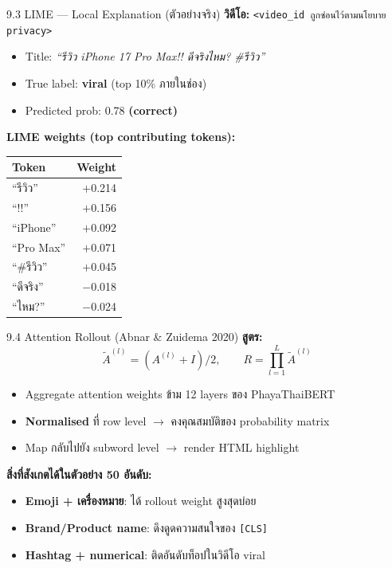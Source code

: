 \documentclass[aspectratio=169,11pt,xcolor=dvipsnames]{beamer}
\newcommand{\hl}[1]{\textcolor{kmitlOrange}{\textbf{#1}}}
\begin{document}
\begin{frame}[shrink=5]{9.3 LIME — Local Explanation (ตัวอย่างจริง)}
  \footnotesize
  \textbf{วิดีโอ:} \texttt{<\texttt{video\_id} ถูกซ่อนไว้ตามนโยบาย privacy>}
  \begin{itemize}
    \item Title: \emph{``รีวิว iPhone 17 Pro Max!! ดีจริงไหม? \#รีวิว''}
    \item True label: \hl{viral} (top 10\% ภายในช่อง)
    \item Predicted prob: 0.78 \hl{(correct)}
  \end{itemize}
  \vspace{0.3em}
  \textbf{LIME weights (top contributing tokens):}
  \begin{center}
    \begin{tabular}{lr}
      \toprule
      \textbf{Token} & \textbf{Weight}\\
      \midrule
      ``รีวิว''       & $+$0.214\\
      ``!!''          & $+$0.156\\
      ``iPhone''      & $+$0.092\\
      ``Pro Max''     & $+$0.071\\
      ``\#รีวิว''      & $+$0.045\\
      \midrule
      ``ดีจริง''       & $-$0.018\\
      ``ไหม?''         & $-$0.024\\
      \bottomrule
    \end{tabular}
  \end{center}
\end{frame}

\begin{frame}{9.4 Attention Rollout (Abnar \& Zuidema 2020)}
  \textbf{สูตร:}
  \[
    \tilde{A}^{(l)} = (A^{(l)} + I)/2, \qquad
    R = \prod_{l=1}^{L} \tilde{A}^{(l)}
  \]
  \begin{itemize}
    \item Aggregate attention weights ข้าม 12 layers ของ PhayaThaiBERT
    \item \hl{Normalised} ที่ row level $\rightarrow$ คงคุณสมบัติของ probability matrix
    \item Map กลับไปยัง subword level $\rightarrow$ render HTML highlight
  \end{itemize}
  \vspace{0.4em}
  \textbf{สิ่งที่สังเกตได้ในตัวอย่าง 50 อันดับ:}
  \begin{itemize}
    \item \hl{Emoji + เครื่องหมาย}: ได้ rollout weight สูงสุดบ่อย
    \item \hl{Brand/Product name}: ดึงดูดความสนใจของ \texttt{[CLS]}
    \item \hl{Hashtag + numerical}: ติดอันดับท็อปในวิดีโอ viral
  \end{itemize}
\end{frame}
\end{document}
